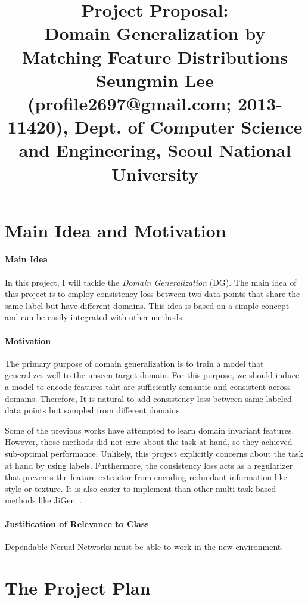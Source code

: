 \documentclass[10pt,twocolumn,letterpaper]{article}
\begin{document}
\title{Project Proposal: \\ Domain Generalization by Matching Feature Distributions \\{\rm {\normalsize Seungmin Lee (profile2697@gmail.com; 2013-11420), Dept. of Computer Science and Engineering, Seoul National University}}} 

\maketitle
\thispagestyle{empty}


\section{Main Idea and Motivation}
\paragraph{Main Idea}  In this project, I will tackle the \textit{Domain Generalization} (DG). The main idea of this project is to employ consistency loss between two data points that share the same label but have different domains. This idea is based on a simple concept and can be easily integrated with other methods.

\paragraph{Motivation}
The primary purpose of domain generalization is to train a model that generalizes well to the unseen target domain. For this purpose, we should induce a model to encode features taht are sufficiently semantic and consistent across domains. Therefore, It is natural to add consistency loss between same-labeled data points but sampled from different domains. 

Some of the previous works have attempted to learn domain invariant features. However, those methods did not care about the task at hand, so they achieved sub-optimal performance. Unlikely, this project explicitly concerns about the task at hand by using labels. Furthermore, the consistency loss acts as a regularizer that prevents the feature extractor from encoding redundant information like style or texture. It is also easier to implement than other multi-task based methods like JiGen~\cite{JiGen}.

\paragraph{Justification of Relevance to Class}
Dependable Nerual Networks must be able to work in the new environment.


\section{The Project Plan}


 



{\small


}
\end{document}

